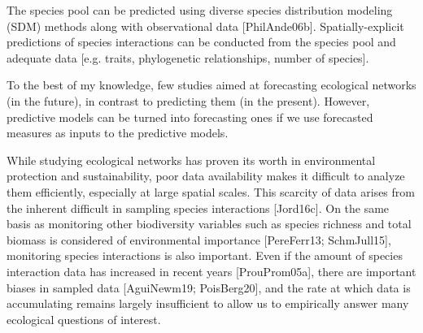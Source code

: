 The species pool can be predicted using diverse species distribution modeling
(SDM) methods along with observational data [PhilAnde06b]. Spatially-explicit
predictions of species interactions can be conducted from the species pool and
adequate data [e.g. traits, phylogenetic relationships, number of species].

To the best of my knowledge, few studies aimed at forecasting ecological
networks (in the future), in contrast to predicting them (in the present).
However, predictive models can be turned into forecasting ones if we use
forecasted measures as inputs to the predictive models.

While studying ecological networks has proven its worth in environmental
protection and sustainability, poor data availability makes it difficult to
analyze them efficiently, especially at large spatial scales. This scarcity of
data arises from the inherent difficult in sampling species interactions
[Jord16c]. On the same basis as monitoring other biodiversity variables such as
species richness and total biomass is considered of environmental importance
[PereFerr13; SchmJull15], monitoring species interactions is also important.
Even if the amount of species interaction data has increased in recent years
[ProuProm05a], there are important biases in sampled data [AguiNewm19;
PoisBerg20], and the rate at which data is accumulating remains largely
insufficient to allow us to empirically answer many ecological questions of
interest.

